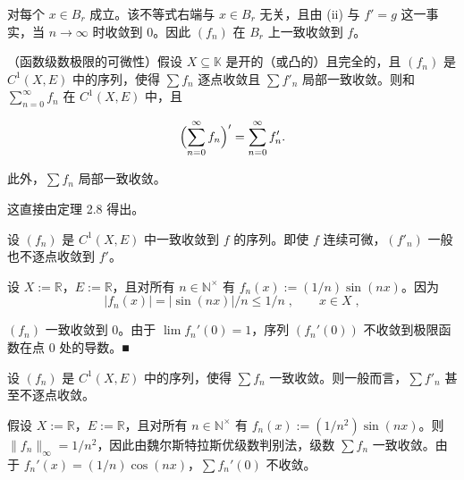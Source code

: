 \begin{theorem}
\begin{subitems}
对每个 $x \in B_r$ 成立。该不等式右端与 $x \in B_r$ 无关，且由 (ii) 与 $f' = g$ 这一事实，当 $n \to \infty$ 时收敛到 $0$。因此 $(f_n)$ 在 $B_r$ 上一致收敛到 $f$。

\end{subitems}

\end{theorem}

\begin{corollary}

（函数级数极限的可微性）假设 $X \subseteq \mathbb{K}$ 是开的（或凸的）且完全的，且 $(f_n)$ 是 $C^1(X, E)$ 中的序列，使得 $\sum f_n$ 逐点收敛且 $\sum f'_n$ 局部一致收敛。则和 $\sum_{n=0}^{\infty} f_n$ 在 $C^1(X, E)$ 中，且

\[
\Bigl(\sum_{n=0}^{\infty}f_{n}\Bigr)^{\prime}=\sum_{n=0}^{\infty}f_{n}^{\prime}.
\]

此外，$ \sum f_n $ 局部一致收敛。

\proofhead
这直接由定理 2.8 得出。
\end{corollary}

\begin{remark}

\begin{items}
\item

设 $ (f_n) $ 是 $ C^1(X, E) $ 中一致收敛到 $ f $ 的序列。即使 $ f $ 连续可微，$ (f'_n) $ 一般也不逐点收敛到 $ f' $。

\proofhead
设 $ X := \mathbb{R} $，$ E := \mathbb{R} $，且对所有 $ n \in \mathbb{N}^{\times} $ 有 $ f_n(x) := (1/n) \sin(nx) $。因为
\[
|f_{n}(x)|=|\sin(n x)|/n\leq1/n\;,\qquad x\in X\;,
\]

$ (f_n) $ 一致收敛到 $ 0 $。由于 $ \lim f_n'(0) = 1 $，序列 $ (f_n'(0)) $ 不收敛到极限函数在点 $ 0 $ 处的导数。■

\item

设 $ (f_n) $ 是 $ C^1(X, E) $ 中的序列，使得 $ \sum f_n $ 一致收敛。则一般而言，$ \sum f'_n $ 甚至不逐点收敛。

\proofhead
假设 $X := \mathbb{R}$，$E := \mathbb{R}$，且对所有 $n \in \mathbb{N}^\times$ 有 $f_n(x) := (1/n^2) \sin(nx)$。则 $\|f_n\|_\infty = 1/n^2$，因此由魏尔斯特拉斯优级数判别法，级数 $\sum f_n$ 一致收敛。由于 $f_n'(x) = (1/n) \cos(nx)$，$\sum f_n'(0)$ 不收敛。
\end{items}

\end{remark}

\exerciseshead

